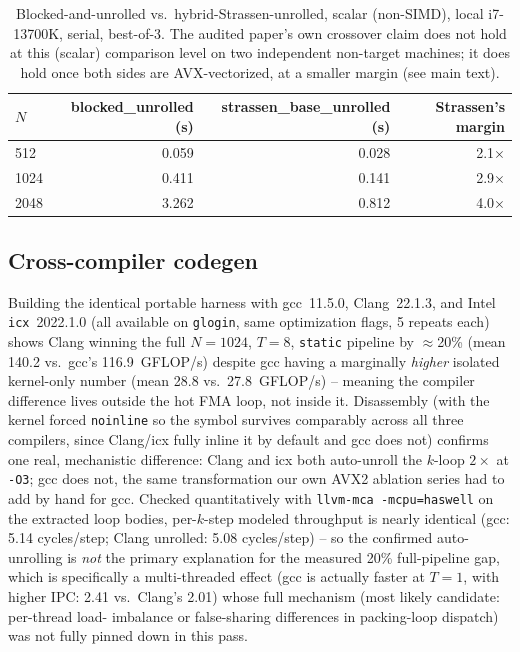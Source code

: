 \documentclass[acmsmall]{acmart}
\begin{document}
\begin{table}[h]
\centering
\small
\caption{Blocked-and-unrolled vs.\ hybrid-Strassen-unrolled, scalar
(non-SIMD), local i7-13700K, serial, best-of-3. The audited paper's own
crossover claim does not hold at this (scalar) comparison level on two
independent non-target machines; it does hold once both sides are
AVX-vectorized, at a smaller margin (see main text).}
\label{tab:blocked-vs-strassen}
\begin{tabular}{lrrr}
\toprule
$N$ & blocked\_unrolled (s) & strassen\_base\_unrolled (s) & Strassen's margin \\
\midrule
512  & 0.059 & 0.028 & 2.1$\times$ \\
1024 & 0.411 & 0.141 & 2.9$\times$ \\
2048 & 3.262 & 0.812 & 4.0$\times$ \\
\bottomrule
\end{tabular}
\end{table}

\subsection{Cross-compiler codegen}
Building the identical portable harness with gcc~11.5.0, Clang~22.1.3,
and Intel \texttt{icx}~2022.1.0 (all available on \texttt{glogin}, same
optimization flags, 5 repeats each) shows Clang winning the full
$N{=}1024$, $T{=}8$, \texttt{static} pipeline by $\approx$20\% (mean
140.2 vs.\ gcc's 116.9~GFLOP/s) despite gcc having a marginally
\emph{higher} isolated kernel-only number (mean 28.8 vs.\ 27.8~GFLOP/s)
-- meaning the compiler difference lives outside the hot FMA loop, not
inside it. Disassembly (with the kernel forced \texttt{noinline} so the
symbol survives comparably across all three compilers, since Clang/icx
fully inline it by default and gcc does not) confirms one real,
mechanistic difference: Clang and icx both auto-unroll the $k$-loop
$2\times$ at \texttt{-O3}; gcc does not, the same transformation our own
AVX2 ablation series had to add by hand for gcc. Checked quantitatively
with \texttt{llvm-mca -mcpu=haswell} on the extracted loop bodies,
per-$k$-step modeled throughput is nearly identical (gcc: 5.14
cycles/step; Clang unrolled: 5.08 cycles/step) -- so the confirmed
auto-unrolling is \emph{not} the primary explanation for the measured
20\% full-pipeline gap, which is specifically a multi-threaded effect
(gcc is actually faster at $T{=}1$, with higher IPC: 2.41 vs.\ Clang's
2.01) whose full mechanism (most likely candidate: per-thread load-
imbalance or false-sharing differences in packing-loop dispatch) was
not fully pinned down in this pass.
\end{document}
